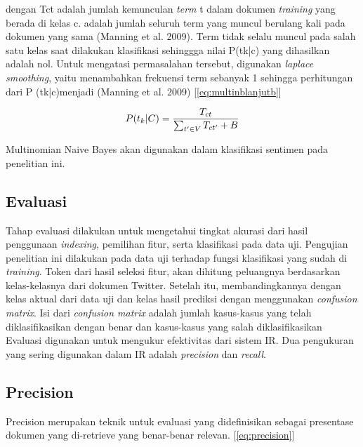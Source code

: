 dengan Tct adalah jumlah kemunculan \textit{term} t dalam dokumen \textit{training} yang berada di kelas c.  adalah jumlah seluruh term yang muncul berulang kali pada dokumen yang sama (Manning et al. 2009).
Term tidak selalu muncul pada salah satu kelas saat dilakukan \newline klasifikasi sehinggga nilai P(tk|c) yang dihasilkan adalah nol. Untuk mengatasi permasalahan tersebut, digunakan \textit{laplace smoothing}, yaitu menambahkan frekuensi term sebanyak 1 sehingga perhitungan dari P (tk|c)menjadi (Manning et al. 2009) [\ref{eq:multinblanjutb}]

\begin{equation}
\begin{split}
\tiny
P(t_k|C) = \frac{T_{ct}}{\sum _{t' \in V} T_{ct'} + B}
\label{eq:multinblanjutb}
\normalsize
\end{split}
\end{equation}

Multinomian Naive Bayes akan digunakan dalam klasifikasi sentimen pada penelitian ini.

\subsection*{Evaluasi}
Tahap evaluasi dilakukan untuk mengetahui tingkat akurasi dari hasil penggunaan \textit{indexing}, pemilihan fitur, serta klasifikasi pada data uji. Pengujian penelitian ini dilakukan pada data uji terhadap fungsi klasifikasi yang sudah di \textit{training}. Token dari hasil seleksi fitur, akan dihitung peluangnya berdasarkan kelas-kelasnya dari dokumen Twitter.
\newline Setelah itu, membandingkannya dengan kelas aktual dari data uji dan kelas hasil prediksi dengan menggunakan \textit{confusion matrix}. Isi dari \textit{confusion matrix} adalah jumlah kasus-kasus yang telah diklasifikasikan dengan benar dan kasus-kasus yang salah diklasifikasikan
\newline Evaluasi digunakan untuk mengukur efektivitas dari sistem IR. Dua pengukuran yang sering digunakan dalam IR adalah \textit{precision} dan \textit{recall}.

\subsection*{Precision}
Precision merupakan teknik untuk evaluasi yang didefinisikan sebagai presentase dokumen yang di-retrieve yang benar-benar relevan. [\ref{eq:precision}]

